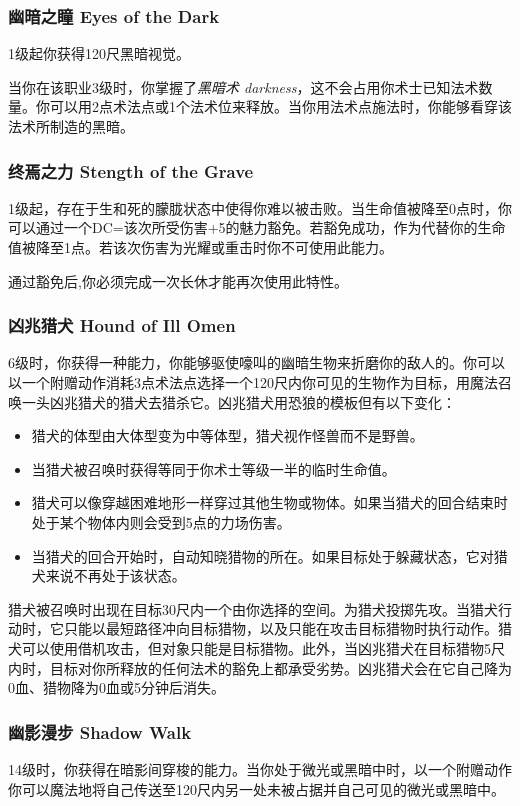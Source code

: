 \subsubsection{幽暗之瞳 Eyes of the Dark}1级起你获得120尺黑暗视觉。

当你在该职业3级时，你掌握了\emph{黑暗术 darkness}，这不会占用你术士已知法术数量。你可以用2点术法点或1个法术位来释放。当你用法术点施法时，你能够看穿该法术所制造的黑暗。

\subsubsection{终焉之力 Stength of the Grave}1级起，存在于生和死的朦胧状态中使得你难以被击败。当生命值被降至0点时，你可以通过一个DC=该次所受伤害+5的魅力豁免。若豁免成功，作为代替你的生命值被降至1点。若该次伤害为光耀或重击时你不可使用此能力。

通过豁免后,你必须完成一次长休才能再次使用此特性。

\subsubsection{凶兆猎犬 Hound of Ill Omen}6级时，你获得一种能力，你能够驱使嚎叫的幽暗生物来折磨你的敌人的。你可以以一个附赠动作消耗3点术法点选择一个120尺内你可见的生物作为目标，用魔法召唤一头凶兆猎犬的猎犬去猎杀它。凶兆猎犬用恐狼的模板但有以下变化：

\begin{itemize}
\item 猎犬的体型由大体型变为中等体型，猎犬视作怪兽而不是野兽。
\item 当猎犬被召唤时获得等同于你术士等级一半的临时生命值。
\item 猎犬可以像穿越困难地形一样穿过其他生物或物体。如果当猎犬的回合结束时处于某个物体内则会受到5点的力场伤害。
\item 当猎犬的回合开始时，自动知晓猎物的所在。如果目标处于躲藏状态，它对猎犬来说不再处于该状态。
\end{itemize}

猎犬被召唤时出现在目标30尺内一个由你选择的空间。为猎犬投掷先攻。当猎犬行动时，它只能以最短路径冲向目标猎物，以及只能在攻击目标猎物时执行动作。猎犬可以使用借机攻击，但对象只能是目标猎物。此外，当凶兆猎犬在目标猎物5尺内时，目标对你所释放的任何法术的豁免上都承受劣势。凶兆猎犬会在它自己降为0血、猎物降为0血或5分钟后消失。

\subsubsection{幽影漫步 Shadow Walk}14级时，你获得在暗影间穿梭的能力。当你处于微光或黑暗中时，以一个附赠动作你可以魔法地将自己传送至120尺内另一处未被占据并自己可见的微光或黑暗中。

